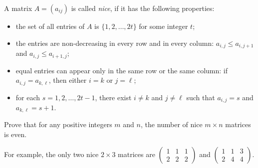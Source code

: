A matrix \(A = (a_{ij})\) is called \emph{nice}, if it has the following properties:
\begin{itemize}
\item[(i)] the set of all entries of \(A\) is \(\{1, 2, \ldots, 2t\}\) for some integer \(t\);
\item[(ii)] the entries are non-decreasing in every row and in every column: \(a_{i,j} \le a_{i,j+1}\) and \(a_{i,j} \le a_{i+1,j}\);
\item[(iii)] equal entries can appear only in the same row or the same column: if \(a_{i,j} = a_{k,\ell}\), then either \(i = k\) or \(j = \ell\);
\item[(iv)] for each \(s = 1, 2, \ldots, 2t-1\), there exist \(i \ne k\) and \(j \ne \ell\) such that \(a_{i,j} = s\) and \(a_{k,\ell} = s+1\).
\end{itemize}

Prove that for any positive integers \(m\) and \(n\), the number of nice \(m \times n\) matrices is even.

For example, the only two nice \(2 \times 3\) matrices are \(\begin{pmatrix} 1 & 1 & 1 \\ 2 & 2 & 2 \end{pmatrix}\) and \(\begin{pmatrix} 1 & 1 & 3 \\ 2 & 4 & 4 \end{pmatrix}\).
